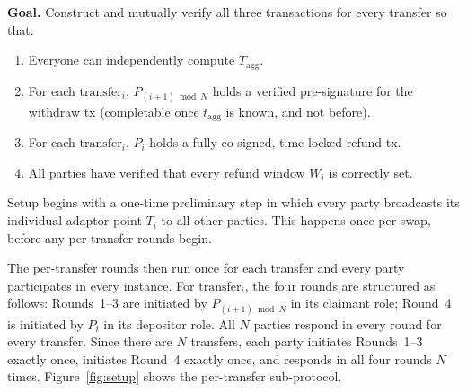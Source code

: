 \documentclass[11pt,a4paper,dvipsnames]{article}
\newcommand{\tagg}{t_{\mathrm{agg}}}
\newcommand{\Tagg}{T_{\mathrm{agg}}}
\begin{document}
\textbf{Goal.}\;
Construct and mutually verify all three transactions for every transfer so
that:
\begin{enumerate}
  \item Everyone can independently compute $\Tagg$.
  \item For each $\mathrm{transfer}_i$, $P_{(i+1)\bmod N}$ holds a verified
    pre-signature for the withdraw tx (completable once $\tagg$ is known, and
    not before).
  \item For each $\mathrm{transfer}_i$, $P_i$ holds a fully co-signed,
    time-locked refund tx.
  \item All parties have verified that every refund window $W_i$ is correctly
    set.
\end{enumerate}

\medskip\noindent
Setup begins with a one-time preliminary step in which every party broadcasts
its individual adaptor point $T_i$ to all other parties.
This happens once per swap, before any per-transfer rounds begin.

The per-transfer rounds then run once for each transfer and every party
participates in every instance.
For $\mathrm{transfer}_i$, the four rounds are structured as follows:
Rounds~1--3 are initiated by $P_{(i+1)\bmod N}$ in its claimant role;
Round~4 is initiated by $P_i$ in its depositor role.
All $N$ parties respond in every round for every transfer.
Since there are $N$ transfers, each party initiates Rounds~1--3 exactly once,
initiates Round~4 exactly once, and responds in all four rounds $N$ times.
Figure~\ref{fig:setup} shows the per-transfer sub-protocol.
\end{document}
